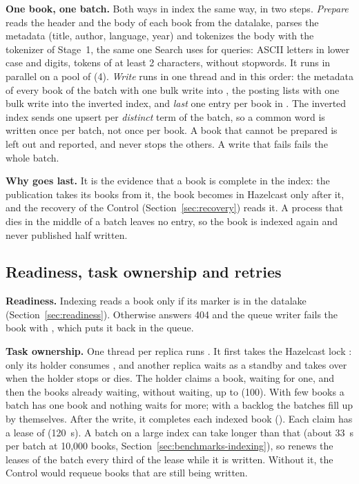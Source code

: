 \textbf{One book, one batch.} Both ways in index the same way, in two steps. \emph{Prepare} reads the header and the
body of each book from the datalake, parses the metadata (title, author, language, year) and tokenizes the body with the
tokenizer of Stage~1, the same one Search uses for queries: ASCII letters in lower case and digits, tokens of at least
2 characters, without stopwords. It runs in parallel on a pool of
 (4). \emph{Write} runs in one thread and in this order: the metadata of every book of the batch
with one bulk write into , the posting lists with one bulk write into the inverted index, and \emph{last}
one entry per book in . The inverted index sends one  upsert per \emph{distinct} term
of the batch, so a common word is written once per batch, not once per book. A book that cannot be prepared is left
out and reported, and never stops the others. A write that fails fails the whole batch.

\textbf{Why  goes last.} It is the evidence that a book is complete in the index: the publication
takes its books from it, the book becomes  in Hazelcast only after it, and the recovery of the Control
(Section~\ref{sec:recovery}) reads it. A process that dies in the middle of a batch leaves no entry, so the book is
indexed again and never published half written.

\subsection{Readiness, task ownership and retries}

\textbf{Readiness.} Indexing reads a book only if its  marker is in the datalake
(Section~\ref{sec:readiness}). Otherwise  answers 404 and the queue writer fails the book with
, which puts it back in the queue.

\textbf{Task ownership.} One thread per replica runs . It first takes the Hazelcast lock
: only its holder consumes , and another replica waits as a standby and takes over
when the holder stops or dies. The holder claims a book, waiting for one, and then the books already waiting, without
waiting, up to  (100). With few books a batch has one book and nothing waits for more; with a
backlog the batches fill up by themselves. After the write, it completes each indexed book (). Each
claim has a lease of  (120~s). A batch on a large index can take longer than that (about 33~s per
batch at 10,000 books, Section~\ref{sec:benchmarks-indexing}), so  renews the leases of the batch
every third of the lease while it is written. Without it, the Control would requeue books that are still being written.

